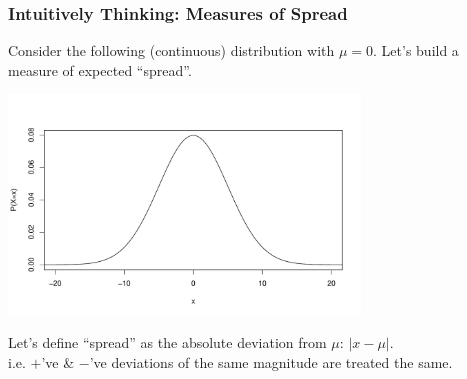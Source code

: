 \documentclass[slides]{beamer}
\newcommand{\blue}[1]{\textcolor{blue2}{#1}}
\begin{document}
%
%
%
%
\begin{frame}
\frametitle{Intuitively Thinking:  Measures of Spread}
Consider the following (continuous) distribution with $\mu=0$.  Let's build a measure of \blue{expected ``spread''}. 
\begin{center}
\includegraphics[width=0.7\textwidth]{spread1}
\end{center}
\pause Let's define ``spread'' as the \blue{absolute deviation from $\mu$}: $|x - \mu|$.\\
i.e. $+$'ve \& $-$'ve deviations of the same magnitude are treated the same.

\end{frame}
\end{document}
